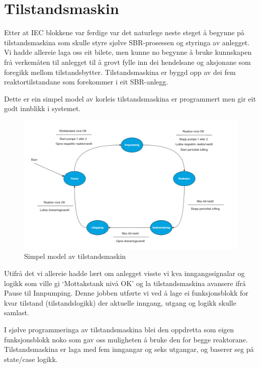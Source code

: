 \section{Tilstandsmaskin}
\thispagestyle{fancy}

Etter at IEC blokkene var ferdige var det naturlege neste steget å begynne på tilstandsmaskina som skulle styre sjølve SBR-prosessen
og styringa av anlegget. Vi hadde allereie laga oss eit bilete, men kunne no begynne å bruke kunnskapen frå verkemåten til anlegget
til å grovt fylle inn dei hendelsane og aksjonane som foregikk mellom tilstandsbytter. 
Tilstandsmaskina er byggd opp av dei fem reaktortilstandane som forekommer i eit SBR-anlegg.

Dette er ein simpel model av korleis tilstandsmaskina er programmert men gir eit godt innblikk i systemet.

\begin{figure}[htbp]
    \centering
    \includegraphics[width=1\textwidth]{Figurar/Simpel tilstandsmaskin.png}
    \caption{Simpel model av tilstandsmaskin}\label{fig:reaktorsoner}
\end{figure}

Utifrå det vi allereie hadde lært om anlegget visste vi kva inngangssignalar og logikk som ville gi
`Mottakstank nivå OK' og la tilstandsmaskina avansere ifrå Pause til Innpumping. Denne jobben utførte vi ved å lage ei
funksjonsblokk for kvar tilstand (tilstandslogikk) der aktuelle inngang, utgang og logikk skulle samlast.

\newpage

I sjølve programmeringa av tilstandsmaskina blei den oppdretta som eigen funksjonsblokk noko som gav oss muligheten å bruke den for begge reaktorane.
Tilstandsmaskina er laga med fem inngangar og seks utgangar, og baserer seg på state/case logikk.

